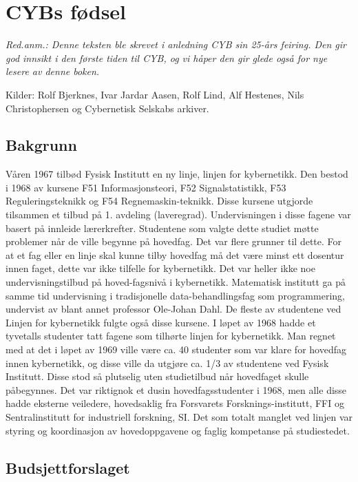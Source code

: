 \chapter{CYBs fødsel}

\author{Av Jon E. Dahlen}

\textit{Red.anm.: Denne teksten ble skrevet i anledning CYB sin 25-års feiring. Den gir god innsikt i den første tiden til CYB, og vi håper den gir glede også for nye lesere av denne boken.}

Kilder: Rolf Bjerknes, Ivar Jardar Aasen, Rolf Lind, Alf Hestenes, Nils Christophersen og Cybernetisk Selskabs arkiver.

\section{Bakgrunn}

Våren 1967 tilbød Fysisk Institutt en ny linje, linjen for kybernetikk. Den bestod i 1968 av kursene F51 Informasjonsteori, F52 Signalstatistikk, F53 Reguleringsteknikk og F54 Regnemaskin-teknikk. Disse kursene utgjorde tilsammen et tilbud på 1. avdeling (laveregrad). Undervisningen i disse fagene var basert på innleide lærerkrefter. Studentene som valgte dette studiet møtte problemer når de ville begynne på hovedfag. Det var flere grunner til dette. For at et fag eller en linje skal kunne tilby hovedfag må det være minst ett dosentur innen faget, dette var ikke tilfelle for kybernetikk. Det var heller ikke noe undervisningstilbud på hoved-fagsnivå i kybernetikk. Matematisk institutt ga på samme tid undervisning i tradisjonelle data-behandlingsfag som programmering, undervist av blant annet professor Ole-Johan Dahl. De fleste av studentene ved Linjen for kybernetikk fulgte også disse kursene. I løpet av 1968 hadde et tyvetalls studenter tatt fagene som tilhørte linjen for kybernetikk. Man regnet med at det i løpet av 1969 ville være ca. 40 studenter som var klare for hovedfag innen kybernetikk, og disse ville da utgjøre ca. 1/3 av studentene ved Fysisk Institutt. Disse stod så plutselig uten studietilbud når hovedfaget skulle påbegynnes. Det var riktignok et dusin hovedfagsstudenter i 1968, men alle disse hadde eksterne veiledere, hovedsaklig fra Forsvarets Forsknings-institutt, FFI og Sentralinstitutt for industriell forskning, SI. Det som totalt manglet ved linjen var styring og koordinasjon av hovedoppgavene og faglig kompetanse på studiestedet.

\section{Budsjettforslaget}

